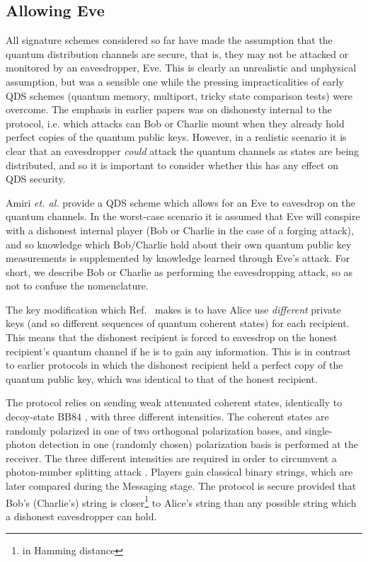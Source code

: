 \subsection{Allowing Eve}
All signature schemes considered so far have made the assumption that the quantum distribution channels are secure, that is, they may not be attacked or monitored by an eavesdropper, Eve. This is clearly an unrealistic and unphysical assumption, but was a sensible one while the pressing impracticalities of early QDS schemes (quantum memory, multiport, tricky state comparison tests) were overcome. The emphasis in earlier papers was on dishonesty internal to the protocol, i.e. which attacks can Bob or Charlie mount when they already hold perfect copies of the quantum public keys. However, in a realistic scenario it is clear that an eavesdropper \emph{could} attack the quantum channels as states are being distributed, and so it is important to consider whether this has any effect on QDS security.

Amiri \emph{et. al.} provide a QDS scheme which allows for an Eve to eavesdrop on the quantum channels. In the worst-case scenario it is assumed that Eve will conspire with a dishonest internal player (Bob or Charlie in the case of a forging attack), and so knowledge which Bob/Charlie hold about their own quantum public key measurements is supplemented by knowledge learned through Eve's attack. For short, we describe Bob or Charlie as performing the eavesdropping attack, so as not to confuse the nomenclature. 

The key modification which Ref.~\cite{Amiri2016} makes is to have Alice use \emph{different} private keys (and so different sequences of quantum coherent states) for each recipient. This means that the dishonest recipient is forced to eavesdrop on the honest recipient's quantum channel if he is to gain any information. This is in contrast to earlier protocols in which the dishonest recipient held a perfect copy of the quantum public key, which was identical to that of the honest recipient. 



The protocol relies on sending weak attenuated coherent states, identically to decoy-state BB$84$ \cite{Lo2005}, with three different intensities. The coherent states are randomly polarized in one of two orthogonal polarization bases, and single-photon detection in one (randomly chosen) polarization basis is performed at the receiver. The three different intensities are required in order to circumvent a photon-number splitting attack \cite{Brassard2000, Lutkenhaus2000}. Players gain classical binary strings, which are later compared during the Messaging stage. The protocol is secure provided that Bob's (Charlie's) string is closer\footnote{in Hamming distance} to Alice's string than any possible string which a dishonest eavesdropper can hold. 

